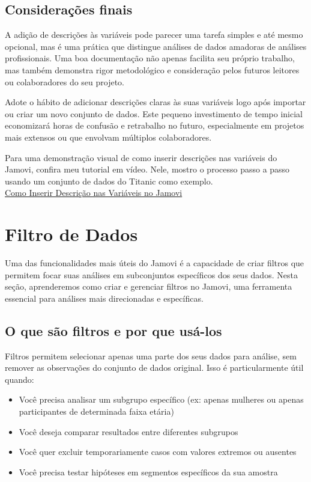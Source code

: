 \subsection{Considerações finais}

A adição de descrições às variáveis pode parecer uma tarefa simples e até mesmo opcional, mas é uma prática que distingue análises de dados amadoras de análises profissionais. Uma boa documentação não apenas facilita seu próprio trabalho, mas também demonstra rigor metodológico e consideração pelos futuros leitores ou colaboradores do seu projeto.

Adote o hábito de adicionar descrições claras às suas variáveis logo após importar ou criar um novo conjunto de dados. Este pequeno investimento de tempo inicial economizará horas de confusão e retrabalho no futuro, especialmente em projetos mais extensos ou que envolvam múltiplos colaboradores.

\begin{tcolorbox}[colback=white,colframe=red,title={\faPlayCircle \ Dica de Conteúdo}]
  Para uma demonstração visual de como inserir descrições nas variáveis do Jamovi, confira meu tutorial em vídeo. Nele, mostro o processo passo a passo usando um conjunto de dados do Titanic como exemplo.\\
  \textcolor{red}{\faYoutube} \href{https://youtu.be/00HUaQaRt_E?si=JdYJKYGYpf6Orlox}{Como Inserir Descrição nas Variáveis no Jamovi}
\end{tcolorbox}

\section{Filtro de Dados}

Uma das funcionalidades mais úteis do Jamovi é a capacidade de criar filtros que permitem focar suas análises em subconjuntos específicos dos seus dados. Nesta seção, aprenderemos como criar e gerenciar filtros no Jamovi, uma ferramenta essencial para análises mais direcionadas e específicas.

\subsection{O que são filtros e por que usá-los}

Filtros permitem selecionar apenas uma parte dos seus dados para análise, sem remover as observações do conjunto de dados original. Isso é particularmente útil quando:

\begin{itemize}
    \item Você precisa analisar um subgrupo específico (ex: apenas mulheres ou apenas participantes de determinada faixa etária)
    \item Você deseja comparar resultados entre diferentes subgrupos
    \item Você quer excluir temporariamente casos com valores extremos ou ausentes
    \item Você precisa testar hipóteses em segmentos específicos da sua amostra
\end{itemize}

